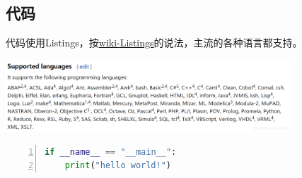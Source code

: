 \documentclass[UTF8]{ctexart}
\newenvironment{marktext}{}{}
\begin{document}
\begin{marktext}


\subsection{代码}


代码使用Listings，按\href{https://en.wikibooks.org/wiki/LaTeX/Source_Code_Listings}{wiki{-}Listings}的说法，主流的各种语言都支持。
\begin{center}
\begin{marktext}
\vspace{\baselineskip}\includegraphics[width=0.8\textwidth]{images/53bb9cd2ced62c6673f39073ca9397b7.png}\vspace{\baselineskip}
\end{marktext}
\end{center}
\end{marktext}
\begin{lstlisting}[language={Python},keywordstyle=\color{blue!70},frame=shadowbox,showstringspaces=false,commentstyle=\color{red!50!green!50!blue!50},escapeinside=``,numbers=left,numberstyle=\small,basicstyle=\small]
if __name__ == "__main__":
	print("hello world!")
\end{lstlisting}
\end{document}
